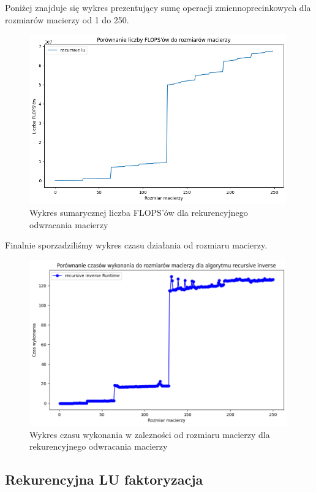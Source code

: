 \documentclass{article}
\begin{document}
\noindent
Poniżej znajduje się wykres prezentujący sumę operacji zmiennoprecinkowych dla rozmiarów macierzy od 1 do 250.

\begin{figure}[H]
  \centering
    \includegraphics[width=0.99\textwidth]{inverse_flops.png}
  \caption{Wykres sumarycznej liczba FLOPS'ów dla rekurencyjnego odwracania macierzy}
\end{figure}

\noindent
Finalnie sporzadziliśmy wykres czasu działania od rozmiaru macierzy.

\begin{figure}[H]
  \centering
    \includegraphics[width=0.99\textwidth]{inverse_time.png}
  \caption{Wykres czasu wykonania w zalezności od rozmiaru macierzy dla rekurencyjnego odwracania macierzy}
\end{figure}

\subsection{Rekurencyjna LU faktoryzacja}
\end{document}
